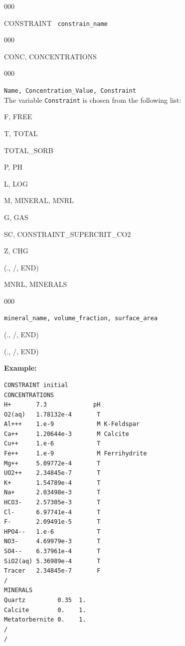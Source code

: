 \documentclass[12pt]{article}
\begin{document}
\begin{deflist}{000}
\item [CONSTRAINT] \ {\tt constrain\_name}
\begin{deflist}{000}
\item[CONC, CONCENTRATIONS]
\begin{deflist}{000}
\item[{\tt Name, Concentration\_Value, Constraint}] ~\\
The variable {\tt Constraint} is chosen from the following list:
\item[F, FREE]
\item[T, TOTAL] 
\item[TOTAL\_SORB]
\item[P, PH]
\item[L, LOG] 
\item[M, MINERAL, MNRL]
\item[G, GAS]
\item[SC, CONSTRAINT\_SUPERCRIT\_CO2] 
\item[Z, CHG]
\end{deflist}
\item[(., /, END)]
\item[MNRL, MINERALS] ~
\begin{deflist}{000}
\item[{\tt mineral\_name, volume\_fraction, surface\_area}]
\end{deflist}
\item[(., /, END)]
\end{deflist}
\item[(., /, END)]
\end{deflist}


\noindent
{\bf Example:}
\begin{verbatim}
CONSTRAINT initial
CONCENTRATIONS
H+       7.3             pH
O2(aq)   1.78132e-4       T
Al+++    1.e-9            M K-Feldspar
Ca++     1.20644e-3       M Calcite
Cu++     1.e-6            T
Fe++     1.e-9            M Ferrihydrite
Mg++     5.09772e-4       T
UO2++    2.34845e-7       T
K+       1.54789e-4       T
Na+      2.03498e-3       T
HCO3-    2.57305e-3       T
Cl-      6.97741e-4       T
F-       2.09491e-5       T
HPO4--   1.e-6            T
NO3-     4.69979e-3       T
SO4--    6.37961e-4       T
SiO2(aq) 5.36989e-4       T
Tracer   2.34845e-7       F
/
MINERALS
Quartz         0.35  1.
Calcite        0.    1.
Metatorbernite 0.    1.
/
/
\end{verbatim}
\end{document}
